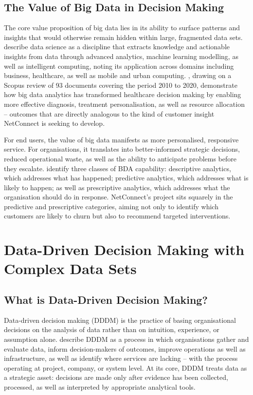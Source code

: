 \documentclass[12pt,a4paper]{article}
\begin{document}
\subsection{The Value of Big Data in Decision Making}

The core value proposition of big data lies in its ability to surface patterns and insights that would otherwise remain hidden within large, fragmented data sets. \textcite{Sarker2021} describe data science as a discipline that extracts knowledge and actionable insights from data through advanced analytics, machine learning modelling, as well as intelligent computing, noting its application across domains including business, healthcare, as well as mobile and urban computing. \textcite{Dicuonzo2022}, drawing on a Scopus review of 93 documents covering the period 2010 to 2020, demonstrate how big data analytics has transformed healthcare decision making by enabling more effective diagnosis, treatment personalisation, as well as resource allocation -- outcomes that are directly analogous to the kind of customer insight NetConnect is seeking to develop.

For end users, the value of big data manifests as more personalised, responsive service. For organisations, it translates into better-informed strategic decisions, reduced operational waste, as well as the ability to anticipate problems before they escalate. \textcite{Sabharwal2021} identify three classes of BDA capability: descriptive analytics, which addresses what has happened; predictive analytics, which addresses what is likely to happen; as well as prescriptive analytics, which addresses what the organisation should do in response. NetConnect's project sits squarely in the predictive and prescriptive categories, aiming not only to identify which customers are likely to churn but also to recommend targeted interventions.

\newpage
\section{Data-Driven Decision Making with Complex Data Sets}

\subsection{What is Data-Driven Decision Making?}

Data-driven decision making (DDDM) is the practice of basing organisational decisions on the analysis of data rather than on intuition, experience, or assumption alone. \textcite{Bhushan2024} describe DDDM as a process in which organisations gather and evaluate data, inform decision-makers of outcomes, improve operations as well as infrastructure, as well as identify where services are lacking -- with the process operating at project, company, or system level. At its core, DDDM treats data as a strategic asset: decisions are made only after evidence has been collected, processed, as well as interpreted by appropriate analytical tools.
\end{document}
